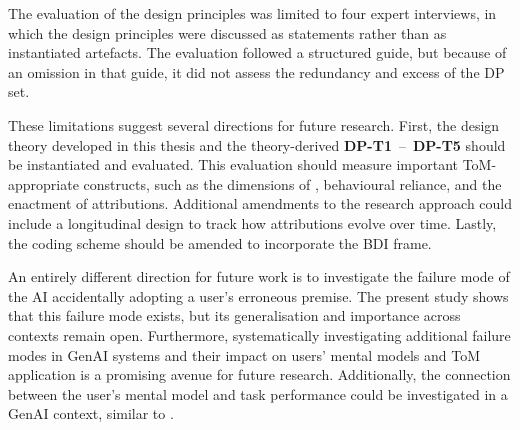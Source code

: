The evaluation of the design principles was limited to four expert interviews, in which the design principles were discussed as statements rather than as instantiated artefacts.  The evaluation followed a structured guide, but because of an omission in that guide, it did not assess the redundancy and excess \parencite{Janiesch2020} of the \ac{DP} set.

These limitations suggest several directions for future research. First, the design theory developed in this thesis and the theory-derived \textbf{DP-T1}~--~\textbf{DP-T5} should be instantiated and evaluated. This evaluation should measure important \ac{ToM}-appropriate constructs, such as the dimensions of \textcite{Colombatto2025}, behavioural reliance, and the enactment of attributions. Additional amendments to the research approach could include a longitudinal design to track how attributions evolve over time. Lastly, the coding scheme should be amended to incorporate the BDI frame.

An entirely different direction for future work is to investigate the failure mode of the \ac{AI} accidentally adopting a user's erroneous premise. The present study shows that this failure mode exists, but its generalisation and importance across contexts remain open. Furthermore, systematically investigating additional failure modes in \ac{GenAI} systems and their impact on users' mental models and \ac{ToM} application is a promising avenue for future research. Additionally, the connection between the user's mental model and task performance could be investigated in a \ac{GenAI} context, similar to \textcite{Bansal2019}.
